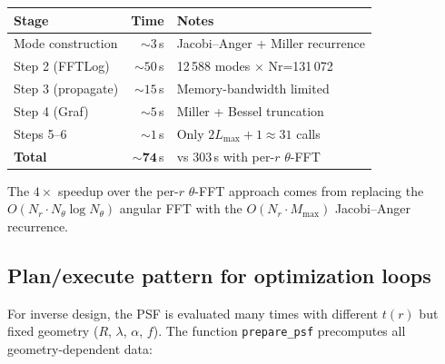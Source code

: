 \documentclass[11pt,a4paper]{article}
\begin{document}
\begin{center}
\begin{tabular}{@{}l r l@{}}
\toprule
\textbf{Stage} & \textbf{Time} & \textbf{Notes} \\
\midrule
Mode construction  & ${\sim}3$\,s  & Jacobi--Anger + Miller recurrence \\
Step 2 (FFTLog)    & ${\sim}50$\,s & 12\,588 modes $\times$ Nr=131\,072 \\
Step 3 (propagate) & ${\sim}15$\,s & Memory-bandwidth limited \\
Step 4 (Graf)      & ${\sim}5$\,s  & Miller + Bessel truncation \\
Steps 5--6         & ${\sim}1$\,s  & Only $2L_{\max}+1 \approx 31$ calls \\
\midrule
\textbf{Total}     & ${\sim}\mathbf{74}$\,s & vs 303\,s with per-$r$ $\theta$-FFT \\
\bottomrule
\end{tabular}
\end{center}

\noindent
The $4\times$ speedup over the per-$r$ $\theta$-FFT approach comes from replacing
the $O(N_r \cdot N_\theta \log N_\theta)$ angular FFT with the
$O(N_r \cdot M_{\max})$ Jacobi--Anger recurrence.

\subsection{Plan/execute pattern for optimization loops}

For inverse design, the PSF is evaluated many times with different
$t(r)$ but fixed geometry ($R$, $\lambda$, $\alpha$, $f$).  The function
\texttt{prepare\_psf} precomputes all geometry-dependent data:
\end{document}
